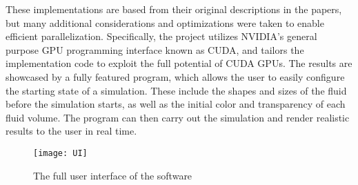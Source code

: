 These implementations are based from their original descriptions in the papers, but many additional considerations and optimizations were taken to enable efficient parallelization. Specifically, the project utilizes NVIDIA's general purpose GPU programming interface known as CUDA, and tailors the implementation code to exploit the full potential of CUDA GPUs. The results are showcased by a fully featured program, which allows the user to easily configure the starting state of a simulation. These include the shapes and sizes of the fluid before the simulation starts, as well as the initial color and transparency of each fluid volume. The program can then carry out the simulation and render realistic results to the user in real time.

\begin{figure}[H]
    \centering
        \texttt{[image: UI]}
    \caption{The full user interface of the software}
    \label{figure UI demo}
\end{figure}